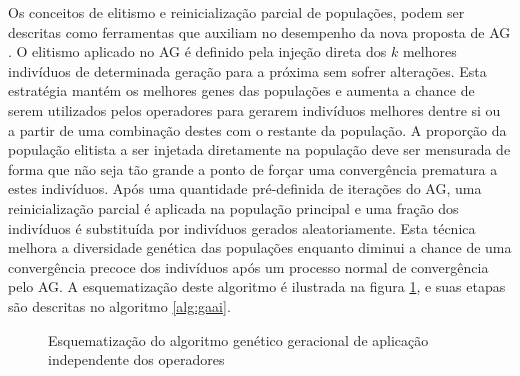 Os conceitos de elitismo e reinicialização parcial de populações, podem ser descritas como ferramentas que auxiliam no desempenho da nova proposta de AG \cite{koumousis2006saw}. O elitismo aplicado no AG é definido pela injeção direta dos $k$ melhores indivíduos de determinada geração para a próxima sem sofrer alterações. Esta estratégia mantém os melhores genes das populações e aumenta a chance de serem utilizados pelos operadores para gerarem indivíduos melhores dentre si ou a partir de uma combinação destes com o restante da população. A proporção da população elitista a ser injetada diretamente na população deve ser mensurada de forma que não seja tão grande a ponto de forçar uma convergência prematura a estes indivíduos. Após uma quantidade pré-definida de iterações do AG, uma reinicialização parcial é aplicada na população principal e uma fração dos indivíduos é substituída por indivíduos gerados aleatoriamente. Esta técnica melhora a diversidade genética das populações enquanto diminui a chance de uma convergência precoce dos indivíduos após um processo normal de convergência pelo AG. A esquematização deste algoritmo é ilustrada na figura \ref{fig:gaai}, e suas etapas são descritas no algoritmo \ref{alg:gaai}.

\begin{figure}
	\centering
	
	\caption{Esquematização do algoritmo genético geracional de aplicação independente dos operadores}\label{fig:gaai}
	
\end{figure}

